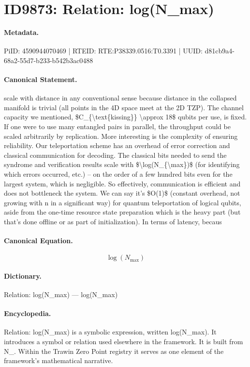\section*{ID9873: Relation: log(N\_max)}
\paragraph{Metadata.}
PiID: 4590944070469 | RTEID: RTE:P38339.0516:T0.3391 | UUID: d81cb9a4-68a2-55d7-b233-b542b3ac0488

\paragraph{Canonical Statement.}
scale with distance in any conventional sense because distance in the collapsed manifold is trivial (all points in the 4D space meet at the 2D TZP). The channel capacity we mentioned, \$C\_\{\textbackslash{}text\{kissing\}\} \textbackslash{}approx 18\$ qubits per use, is fixed. If one were to use many entangled pairs in parallel, the throughput could be scaled arbitrarily by replication. More interesting is the complexity of ensuring reliability. Our teleportation scheme has an overhead of error correction and classical communication for decoding. The classical bits needed to send the syndrome and verification results scale with \$\textbackslash{}log(N\_\{\textbackslash{}max\})\$ (for identifying which errors occurred, etc.) – on the order of a few hundred bits even for the largest system, which is negligible. So effectively, communication is efficient and does not bottleneck the system. We can say it’s \$O(1)\$ (constant overhead, not growing with n in a significant way) for quantum teleportation of logical qubits, aside from the one-time resource state preparation which is the heavy part (but that’s done offline or as part of initialization). In terms of latency, becaus

\paragraph{Canonical Equation.}
\[
\log(N_{\max})
\]

\paragraph{Dictionary.}
Relation: log(N\_max) — log(N\_max)

\paragraph{Encyclopedia.}
Relation: log(N\_max) is a symbolic expression, written log(N\_max). It introduces a symbol or relation used elsewhere in the framework. It is built from N\_. Within the Trawin Zero Point registry it serves as one element of the framework's mathematical narrative.
